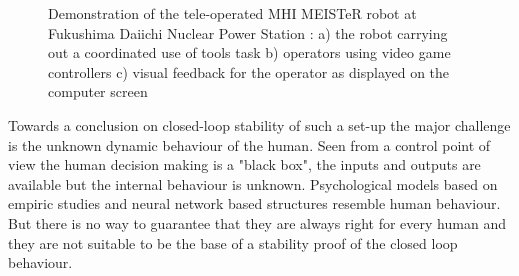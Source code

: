 \documentclass[a4paper,twoside, openright,12pt]{report}
\begin{document}
\begin{figure}
	\centering
	\caption[Demonstration of MHI MEISTeR at Fukushima Daiichi NPS]{Demonstration of the tele-operated MHI MEISTeR robot at Fukushima Daiichi Nuclear Power Station \cite{MHI-MEISTeR}: a) the robot carrying out a coordinated use of tools task b) operators using video game controllers c) visual feedback for the operator as displayed on the computer screen}
	\label{FIG:MEISTeR}
	\vspace{-10pt}
\end{figure} 
Towards a conclusion on closed-loop stability of such a set-up the major challenge is the unknown dynamic behaviour of the human. Seen from a control point of view the human decision making is a "black box", the inputs and outputs are available but the internal behaviour is unknown. Psychological models based on empiric studies and neural network based structures \cite{Peters_15} resemble human behaviour. But there is no way to guarantee that they are always right for every human and they are not suitable to be the base of a stability proof of the closed loop behaviour.
\end{document}
